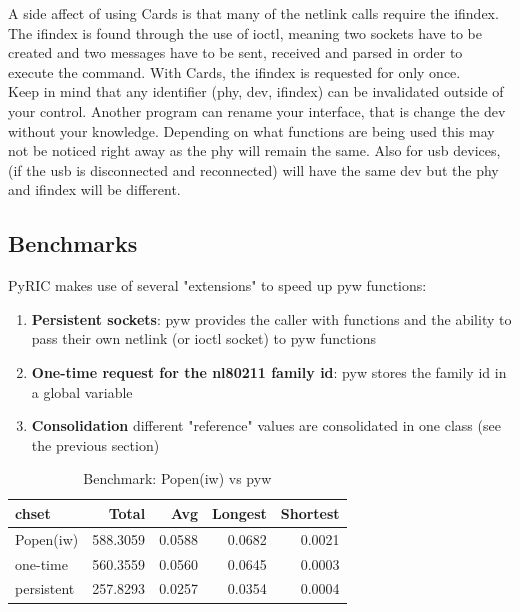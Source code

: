 \documentclass[11pt]{article}
\begin{document}
A side affect of using Cards is that many of the netlink calls require the ifindex.
The ifindex is found through the use of ioctl, meaning two sockets have to be 
created and two messages have to be sent, received and parsed in order to execute
the command. With Cards, the ifindex is requested for only once. \\

Keep in mind that any identifier (phy, dev, ifindex) can be invalidated outside 
of your control. Another program can rename your interface, that is change the 
dev without your knowledge. Depending on what functions are being used this may 
not be noticed right away as the phy will remain the same. Also for usb devices, 
(if the usb is disconnected and reconnected) will have the same dev but the phy 
and ifindex will be different.

\subsection{Benchmarks}
PyRIC makes use of several "extensions" to speed up pyw functions:
\begin{enumerate}
\item \textbf{Persistent sockets}: pyw provides the caller with functions and 
the ability to pass their own netlink (or ioctl socket) to pyw functions
\item \textbf{One-time request for the nl80211 family id}: pyw stores the family
id in a global variable
\item \textbf{Consolidation} different "reference" values are consolidated in one
class (see the previous section)
\end{enumerate}

\begin{table}
\begin{center}
\begin{tabular}{| l | r | r | r | r|}
\hline
chset & Total & Avg & Longest & Shortest \\
\hline
Popen(iw) & 588.3059 & 0.0588 & 0.0682 & 0.0021 \\
\hline
one-time & 560.3559 & 0.0560 & 0.0645 & 0.0003 \\
\hline
persistent & 257.8293 & 0.0257 & 0.0354 & 0.0004 \\
\hline
\end{tabular}
\caption{Benchmark: Popen(iw) vs pyw} 
\end{center}
\label{tab:benchmark}
\end{table}
\end{document}
